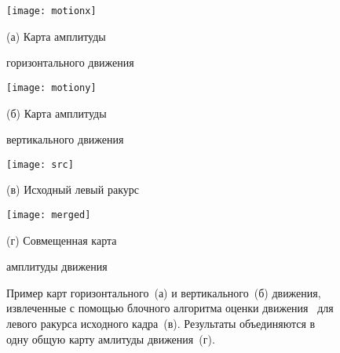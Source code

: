 \begin{figure}[!h]
	\begin{minipage}[t]{0.49\linewidth}
		\centering
		\centerline{ \texttt{[image: motionx]} }
		\centerline{(а) Карта амплитуды}
		\centerline{горизонтального движения}\medskip
	\end{minipage}%
	\hfill
	\begin{minipage}[t]{0.49\linewidth}
		\centering
		\centerline{\texttt{[image: motiony]} }
		\centerline{(б) Карта амплитуды}
		\centerline{вертикального движения}\medskip
	\end{minipage}
	\begin{minipage}[t]{0.49\linewidth}
		\centering
		\centerline{ \texttt{[image: src]} }
		\centerline{(в) Исходный левый ракурс}\medskip
	\end{minipage}%
	\hfill
	\begin{minipage}[t]{0.49\linewidth}
		\centering
		\centerline{\texttt{[image: merged]} }
		\centerline{(г) Совмещенная карта}
		\centerline{амплитуды движения}\medskip
	\end{minipage}
	\begin{minipage}[t]{\linewidth}
	\caption{Пример карт горизонтального~(а) и вертикального~(б) движения, извлеченные
        с помощью блочного алгоритма оценки движения~\cite{simonyan2008fast} для левого ракурса исходного кадра~(в).
        Результаты объединяются в одну общую карту амлитуды движения~(г).}
    \label{fig:merged}
    \end{minipage}
\end{figure}
